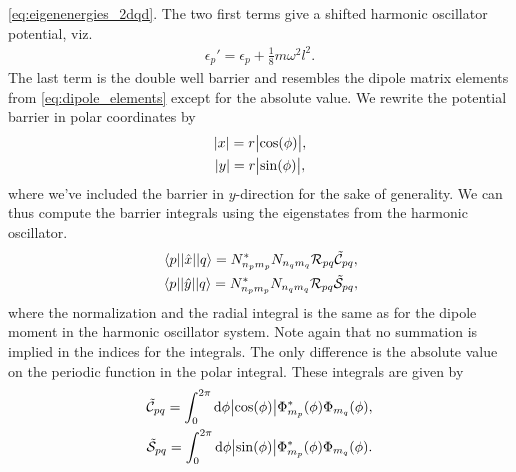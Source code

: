         \autoref{eq:eigenenergies_2dqd}.
        The two first terms give a shifted harmonic oscillator potential, viz.
        \begin{align}
            \epsilon_p' = \epsilon_p + \frac{1}{8} m \omega^2 l^2.
        \end{align}
        The last term is the double well barrier and resembles the dipole matrix
        elements from \autoref{eq:dipole_elements} except for the absolute
        value.
        We rewrite the potential barrier in polar coordinates by
        \begin{gather}
            \abs{x} = r\abs{\cos(\phi)}, \\
            \abs{y} = r\abs{\sin(\phi)},
        \end{gather}
        where we've included the barrier in $y$-direction for the sake of
        generality.
        We can thus compute the barrier integrals using the eigenstates from the
        harmonic oscillator.
        \begin{gather}
            \mel{p}{\abs{\position}}{q}
            =
            N^{*}_{n_p m_p} N_{n_q m_q}
            \mathcal{R}_{pq} \tilde{\mathcal{C}}_{pq},
            \\
            \mel{p}{\abs{\position[y]}}{q}
            =
            N^{*}_{n_p m_p} N_{n_q m_q}
            \mathcal{R}_{pq} \tilde{\mathcal{S}}_{pq},
        \end{gather}
        where the normalization and the radial integral is the same as for the
        dipole moment in the harmonic oscillator system.
        Note again that no summation is implied in the indices for the
        integrals.
        The only difference is the absolute value on the periodic function in
        the polar integral.
        These integrals are given by
        \begin{gather}
            \tilde{\mathcal{C}}_{pq}
            =
            \int_{0}^{2\pi} \dd \phi
            \abs{\cos(\phi)}
            \Phi^{*}_{m_p}(\phi)
            \Phi_{m_q}(\phi),
            \\
            \tilde{\mathcal{S}}_{pq}
            =
            \int_{0}^{2\pi} \dd \phi
            \abs{\sin(\phi)}
            \Phi^{*}_{m_p}(\phi)
            \Phi_{m_q}(\phi).
        \end{gather}


